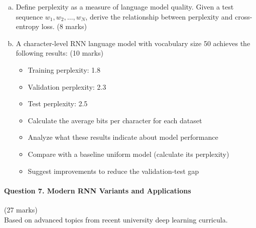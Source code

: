 \documentclass[12pt]{article}
\newcommand{\mediumanswer}{\vspace{3cm}}
\begin{document}
\begin{enumerate}[(a)]
    \item Define perplexity as a measure of language model quality. Given a test sequence $w_1, w_2, \ldots, w_N$, derive the relationship between perplexity and cross-entropy loss. \hfill (8 marks)
    
    \mediumanswer
    
    \item A character-level RNN language model with vocabulary size 50 achieves the following results: \hfill (10 marks)
    \begin{itemize}
        \item Training perplexity: 1.8
        \item Validation perplexity: 2.3
        \item Test perplexity: 2.5
    \end{itemize}
    
    \begin{itemize}
        \item Calculate the average bits per character for each dataset
        \item Analyze what these results indicate about model performance
        \item Compare with a baseline uniform model (calculate its perplexity)
        \item Suggest improvements to reduce the validation-test gap
    \end{itemize}
    
    \mediumanswer
\end{enumerate}

\newpage
\paragraph{Question 7. Modern RNN Variants and Applications}\hfill (27 marks)\\
Based on advanced topics from recent university deep learning curricula.
\end{document}
